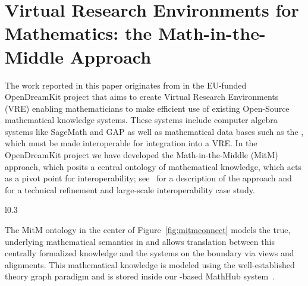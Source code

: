 \section{Virtual Research Environments for Mathematics: the Math-in-the-Middle
  Approach}\label{sec:mmtmitm}

The work reported in this paper originates from in the EU-funded OpenDreamKit
\cite{OpenDreamKit:on} project that aims to create Virtual Research Environments (VRE)
enabling mathematicians to make efficient use of existing Open-Source mathematical
knowledge systems.  These systems include computer algebra systems like SageMath and GAP
as well as mathematical data bases such as the \lmfdb, which must be made interoperable
for integration into a VRE. In the OpenDreamKit project we have developed the
Math-in-the-Middle (MitM) approach, which posits a central ontology of mathematical
knowledge, which acts as a pivot point for interoperability; see~\cite{DehKohKon:iop16}
for a description of the approach and \cite{KohMuePfe:kbimss17} for a technical refinement
and large-scale interoperability case study. 

\begin{wrapfigure}l{0.3\textwidth}%
  \caption{The MiTM Approach to Connecting Systems.}\label{fig:mitmconnect}\vspace*{-1em}
\end{wrapfigure}
The MitM ontology in the center of Figure~\ref{fig:mitmconnect} models the true,
underlying mathematical semantics in \ommt and allows translation between this centrally
formalized knowledge and the systems on the boundary via views and alignments.
This mathematical knowledge is modeled using the well-established theory graph paradigm
and is stored inside our \ommt-based MathHub system~\cite{MathHub:on}. 

